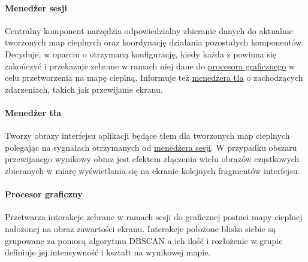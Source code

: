 \paragraph{Menedżer sesji} 
\label{par:rs_session_manager}
Centralny komponent narzędzia odpowiedzialny zbieranie danych do aktualnie tworzonych map cieplnych oraz koordynację działania pozostałych komponentów. Decyduje, w oparciu o otrzymaną konfigurację, kiedy każda z \session[i] powinna się zakończyć i przekazuje zebrane w ramach niej dane do  \hyperref[par:rs_graphical_processor]{procesora graficznego} w celu przetworzenia na mapę cieplną. Informuje też \hyperref[par:rs_bg_manager]{menedżera tła} o zachodzących zdarzeniach, takich jak przewijanie ekranu.

\paragraph{Menedżer tła} 
\label{par:rs_bg_manager}
Tworzy obrazy interfejsu aplikacji będące tłem dla tworzonych map cieplnych polegając na sygnałach otrzymanych od \hyperref[par:rs_session_manager]{menedżera sesji}. W przypadku obszaru przewijanego wynikowy obraz jest efektem złączenia wielu  obrazów cząstkowych zbieranych w miarę wyświetlania się na ekranie kolejnych fragmentów interfejsu.

\paragraph{Procesor graficzny} 
\label{par:rs_graphical_processor}
Przetwarza interakcje zebrane w ramach sesji do graficznej postaci mapy cieplnej nałożonej na obraz zawartości ekranu. Interakcje położone blisko siebie są grupowane za pomocą algorytmu DBSCAN \cite{DBSCAN_Wiki} a ich ilość i rozłożenie w grupie definiuje jej intensywność i kształt na wynikowej mapie.
